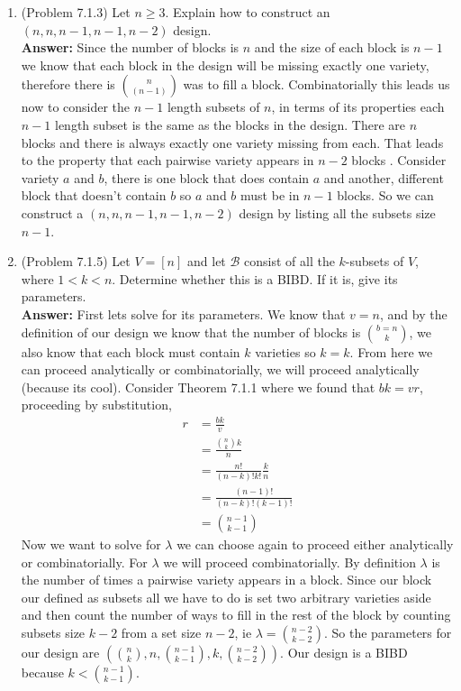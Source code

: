 \documentclass{amsart}
\begin{document}
\begin{enumerate}
	\vspace{1in}
	
	
\item (Problem 7.1.3) Let $n \geq 3$. Explain how to construct an $(n,n,n-1,n-1,n-2)$ design.\\

	\textbf{Answer:} Since the number of blocks is $n$ and the size of each block is $n-1$ we know that each block in the design will be missing exactly one variety, therefore there is $n \choose (n-1)$ was to fill a block. Combinatorially this leads us now to consider the $n-1$ length subsets of $n$, in terms of its properties each $n-1$ length subset is the same as the blocks in the design. There are $n$ blocks and there is always exactly one variety missing from each. That leads to the property that each pairwise variety appears in $n-2$ blocks . Consider variety $a$ and $b$, there is one block that does contain $a$ and another, different block that doesn't contain $b$ so $a$ and $b$ must be in $n-1$ blocks. So we can construct a $(n,n,n-1,n-1,n-2)$ design by listing all the subsets size $n-1$.

	\vspace{1in}

\item (Problem 7.1.5) Let $V=[n]$ and let $\mathcal{B}$ consist of all the $k$-subsets of $V$, where $1 < k < n.$ Determine whether this is a BIBD. If it is, give its parameters.\\

\textbf{Answer:} First lets solve for its parameters. We know that $v = n$, and by the definition of our design we know that the number of blocks is $b = n \choose k$, we also know that each block must contain $k$ varieties so $k = k$. From here we can proceed analytically or combinatorially, we will proceed analytically (because its cool). Consider Theorem 7.1.1 where we found that $bk = vr$, proceeding by substitution,
\begin{align*}
r &=\frac{bk}{v}\\
  &=\frac{{n \choose k} k}{n}\\
  &=\frac{n!}{(n-k)!k!} \frac{k}{n}\\
  &=\frac{(n-1)!}{(n-k)!(k-1)!}\\
  &= {n-1 \choose k-1}
\end{align*}
Now we want to solve for $\lambda$ we can choose again to proceed either analytically or combinatorially. For $\lambda$ we will proceed combinatorially. By definition $\lambda$ is the number of times a pairwise variety appears in a block. Since our block our defined as subsets all we have to do is set two arbitrary varieties aside and then count the number of ways to fill in the rest of the block by counting subsets size $k - 2$ from a set size $n - 2$, ie $\lambda = {n-2 \choose k-2}$. So the parameters for our design are $({n \choose k},n,{n-1 \choose k-1}, k ,{n-2 \choose k-2})$. Our design is a BIBD because $k < {n-1 \choose k-1}$.
	\vspace{1in}


\end{enumerate}
\end{document}
